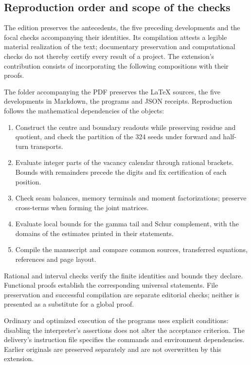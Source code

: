 \clearpage
\subsection{Reproduction order and scope of the checks}

The edition preserves the antecedents, the five preceding developments and
the focal checks accompanying their identities. Its compilation attests
a legible material realization of the text; documentary preservation and
computational checks do not thereby certify every result
of a project. The extension's contribution consists of
incorporating the following compositions with their proofs.

The folder accompanying the PDF preserves the \LaTeX{} sources, the five
developments in Markdown, the programs and JSON receipts. Reproduction
follows the mathematical dependencies of the objects:

\begin{enumerate}
\item Construct the centre and boundary readouts while preserving residue and
quotient, and check the partition of the 324 seeds under forward and
half-turn transports.
\item Evaluate integer parts of the vacancy calendar through
rational brackets. Bounds with remainders precede the digits and fix
certification of each position.
\item Check seam balances, memory terminals and
moment factorizations; preserve cross-terms when forming
the joint matrices.
\item Evaluate local bounds for the gamma tail and Schur complement,
with the domains of the estimates printed in their statements.
\item Compile the manuscript and compare common sources, transferred equations,
references and page layout.
\end{enumerate}

Rational and interval checks verify the finite identities and
bounds they declare. Functional proofs establish the
corresponding universal statements. File preservation and
successful compilation are separate editorial checks;
neither is presented as a substitute for a global proof.

Ordinary and optimized execution of the programs uses explicit
conditions: disabling the interpreter's assertions does not alter the acceptance
criterion. The delivery's instruction file specifies the
commands and environment dependencies. Earlier originals are
preserved separately and are not overwritten by this extension.
\par\endgroup

